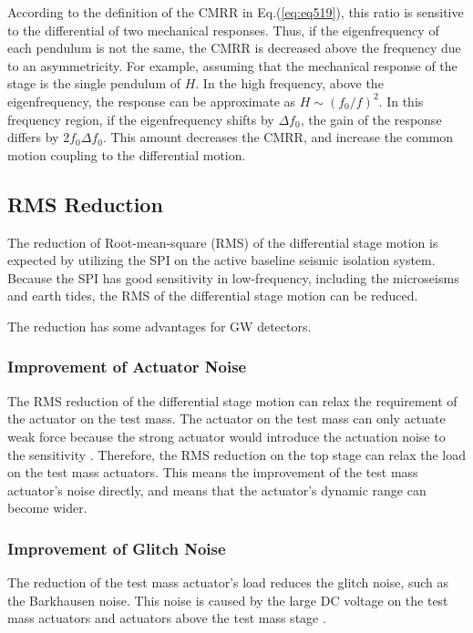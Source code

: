 According to the definition of the CMRR in Eq.(\ref{eq:eq519}), this ratio is sensitive to the differential of two mechanical responses. Thus, if the eigenfrequency of each pendulum is not the same, the CMRR is decreased above the frequency due to an asymmetricity. For example, assuming that the mechanical response of the stage is the single pendulum of $H$. In the high frequency, above the eigenfrequency, the response can be approximate as $H\sim{({f_0}/{f})^2}$. In this frequency region, if the eigenfrequency shifts by $\Delta{f_0}$, the gain of the response differs by $2f_0\Delta{f_0}$. This amount decreases the CMRR, and increase the common motion coupling to the differential motion.


\subsection{RMS Reduction}
The reduction of Root-mean-square (RMS) of the differential stage motion is expected by utilizing the SPI on the active baseline seismic isolation system. Because the SPI has good sensitivity in low-frequency, including the microseisms and earth tides, the RMS of the differential stage motion can be reduced.

The reduction has some advantages for GW detectors.

\subsubsection{Improvement of Actuator Noise}
The RMS reduction of the differential stage motion can relax the requirement of the actuator on the test mass. The actuator on the test mass can only actuate weak force because the strong actuator would introduce the actuation noise to the sensitivity \cite{michimura2017mirror}. Therefore, the RMS reduction on the top stage can relax the load on the test mass actuators. This means the improvement of the test mass actuator's noise directly, and means that the actuator's dynamic range can become wider.

\subsubsection{Improvement of Glitch Noise}
The reduction of the test mass actuator's load reduces the glitch noise, such as the Barkhausen noise. This noise is caused by the large DC voltage on the test mass actuators and actuators above the test mass stage \cite{aasi2015characterization}.



